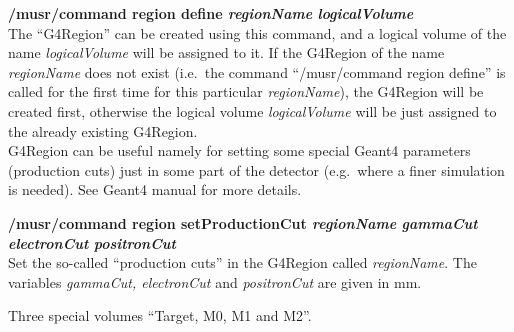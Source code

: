 \documentclass[twoside]{dis04}
\begin{document}
\begin{description}
\item{\bf /musr/command region define  \emph{regionName} \emph{logicalVolume}}\\
	The ``G4Region'' can be created using this command, and a logical volume of the
	name \emph{logicalVolume} will be assigned to it.  If the G4Region of the name 
	\emph{regionName} does not exist (i.e.\ the command ``/musr/command region define''
	is called for the first time for this particular \emph{regionName}), the G4Region will
	be created first, otherwise the logical volume \emph{logicalVolume} will be just assigned
	to the already existing G4Region.  \\
	G4Region can be useful namely for setting some special Geant4 parameters (production cuts)
	just in some part of the detector (e.g.\ where a finer simulation is needed).
	See Geant4 manual for more details.

\item{\bf /musr/command region setProductionCut \emph{regionName} \emph{gammaCut} \emph{electronCut} \emph{positronCut}}\\
	Set the so-called ``production cuts'' in the G4Region called \emph{regionName}.
	The variables \emph{gammaCut, electronCut} and \emph{positronCut} are given in mm.
\end{description}
Three special volumes ``Target, M0, M1 and M2''.

\end{document}
